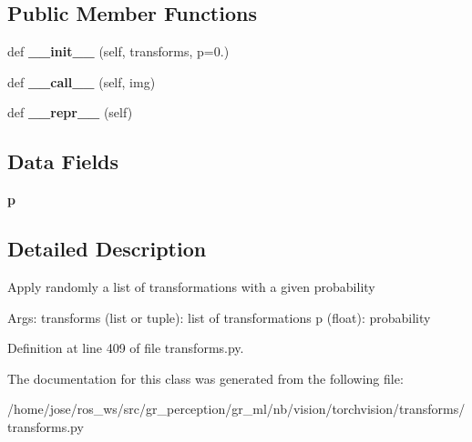 \subsection*{Public Member Functions}
\begin{DoxyCompactItemize}
\item 
\mbox{\label{classtorchvision_1_1transforms_1_1transforms_1_1RandomApply_aed818c472362c84d5581760bf3673a1e}} 
def {\bfseries \+\_\+\+\_\+init\+\_\+\+\_\+} (self, transforms, p=0.)
\item 
\mbox{\label{classtorchvision_1_1transforms_1_1transforms_1_1RandomApply_a23c180e6fcdc5516ebba6af8dd9110a8}} 
def {\bfseries \+\_\+\+\_\+call\+\_\+\+\_\+} (self, img)
\item 
\mbox{\label{classtorchvision_1_1transforms_1_1transforms_1_1RandomApply_a3d0e0c2d932be6172b4556ce761520db}} 
def {\bfseries \+\_\+\+\_\+repr\+\_\+\+\_\+} (self)
\end{DoxyCompactItemize}
\subsection*{Data Fields}
\begin{DoxyCompactItemize}
\item 
\mbox{\label{classtorchvision_1_1transforms_1_1transforms_1_1RandomApply_a525fe9b45c9c4f452eacbda021e0e720}} 
{\bfseries p}
\end{DoxyCompactItemize}


\subsection{Detailed Description}
\begin{DoxyVerb}Apply randomly a list of transformations with a given probability

Args:
    transforms (list or tuple): list of transformations
    p (float): probability
\end{DoxyVerb}
 

Definition at line 409 of file transforms.\+py.



The documentation for this class was generated from the following file\+:\begin{DoxyCompactItemize}
\item 
/home/jose/ros\+\_\+ws/src/gr\+\_\+perception/gr\+\_\+ml/nb/vision/torchvision/transforms/transforms.\+py\end{DoxyCompactItemize}
